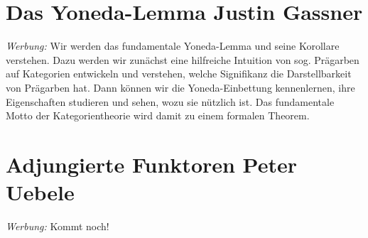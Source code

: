 \documentclass[a4paper,ngerman]{scrartcl}
\theoremstyle{definition}
\theoremstyle{plain}
\theoremstyle{remark}
\begin{document}
\section[Das Yoneda-Lemma]{Das Yoneda-Lemma \hfill \small Justin Gassner}

\emph{Werbung:} Wir werden das fundamentale Yoneda-Lemma und seine Korollare
verstehen. Dazu werden wir zunächst eine hilfreiche Intuition von sog. Prägarben auf
Kategorien entwickeln und verstehen, welche Signifikanz die Darstellbarkeit von
Prägarben hat. Dann können wir die Yoneda-Einbettung kennenlernen, ihre
Eigenschaften studieren und sehen, wozu sie nützlich ist. Das fundamentale
Motto der Kategorientheorie wird damit zu einem formalen Theorem.


\section[Adjungierte Funktoren]{Adjungierte Funktoren \hfill \small Peter
Uebele}

\emph{Werbung:} Kommt noch!


\nocite{*}
\printbibliography
\end{document}

